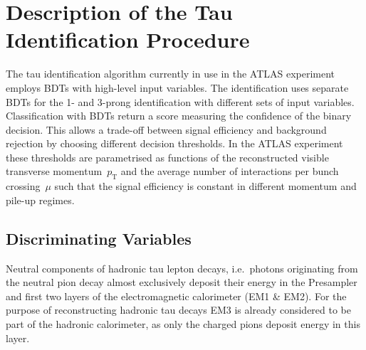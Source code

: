 \section{Description of the Tau Identification Procedure}
\label{sec:bdt_tauid}
The tau identification algorithm currently in use in the ATLAS experiment
employs BDTs with high-level input variables. The identification uses separate
BDTs for the 1- and 3-prong identification with different sets of input
variables. Classification with BDTs return a score measuring the confidence of
the binary decision. This allows a trade-off between signal efficiency and
background rejection by choosing different decision thresholds. In the ATLAS
experiment these thresholds are parametrised as functions of the reconstructed
visible transverse momentum~$p_\text{T}$ and the average number of interactions
per bunch crossing~$\mu$ such that the signal efficiency is constant in
different momentum and pile-up regimes.

\subsection{Discriminating Variables}
\label{sec:bdt_features}

Neutral components of hadronic tau lepton decays, i.e.\ photons originating from
the neutral pion decay almost exclusively deposit their energy in the Presampler
and first two layers of the electromagnetic calorimeter (EM1 \& EM2). For the
purpose of reconstructing hadronic tau decays EM3 is already considered to be
part of the hadronic calorimeter, as only the charged pions deposit energy in
this layer.

